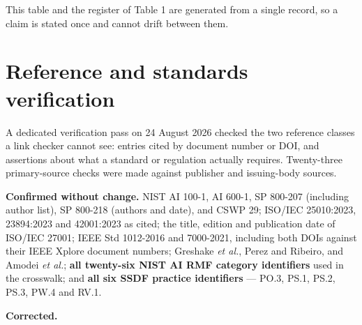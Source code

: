 \documentclass[11pt,a4paper,twoside,openany]{book}
\begin{document}
This table and the register of Table 1 are generated from a single record, so a claim is stated once and cannot drift between them.


\FloatBarrier
\section*{Reference and standards verification}

A dedicated verification pass on 24 August 2026 checked the two reference classes a link checker cannot see: entries cited by document number or DOI, and assertions about what a standard or regulation actually requires. Twenty-three primary-source checks were made against publisher and issuing-body sources.


\textbf{Confirmed without change.} NIST AI 100-1, AI 600-1, SP 800-207 (including author list), SP 800-218 (authors and date), and CSWP 29; ISO/IEC 25010:2023, 23894:2023 and 42001:2023 as cited; the title, edition and publication date of ISO/IEC 27001; IEEE Std 1012-2016 and 7000-2021, including both DOIs against their IEEE Xplore document numbers; Greshake \emph{et al.}, Perez and Ribeiro, and Amodei \emph{et al.}; \textbf{all twenty-six NIST AI RMF category identifiers} used in the crosswalk; and \textbf{all six SSDF practice identifiers} — PO.3, PS.1, PS.2, PS.3, PW.4 and RV.1.


\textbf{Corrected.}
\end{document}
